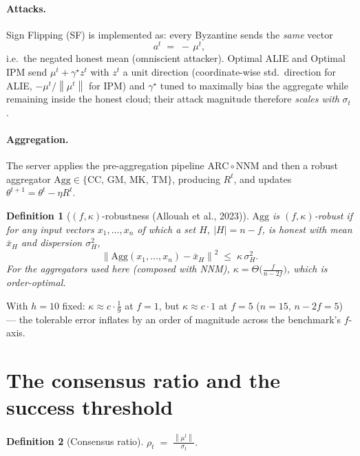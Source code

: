 \documentclass[11pt]{article}
\newtheorem{definition}{Definition}
\newcommand{\norm}[1]{\left\lVert #1 \right\rVert}
\newcommand{\agg}{\mathrm{Agg}}
\begin{document}
\paragraph{Attacks.} Sign Flipping (SF) is implemented as: every Byzantine
sends the \emph{same} vector
\begin{equation}
a^t \;=\; -\,\mu^t ,
\label{eq:sf}
\end{equation}
i.e.\ the negated honest mean (omniscient attacker). Optimal ALIE and Optimal
IPM send $\mu^t + \gamma^\star z^t$ with $z^t$ a unit direction (coordinate-wise
std.\ direction for ALIE, $-\mu^t/\norm{\mu^t}$ for IPM) and $\gamma^\star$
tuned to maximally bias the aggregate while remaining inside the honest cloud;
their attack magnitude therefore \emph{scales with} $\sigma_t$.

\paragraph{Aggregation.} The server applies the pre-aggregation pipeline
$\mathrm{ARC}\circ\mathrm{NNM}$ and then a robust aggregator
$\agg \in \{\text{CC, GM, MK, TM}\}$, producing $R^t$, and updates
$\theta^{t+1} = \theta^t - \eta R^t$.

\begin{definition}[$(f,\kappa)$-robustness \textnormal{(Allouah et al., 2023)}]
$\agg$ is $(f,\kappa)$-robust if for any input vectors $x_1,\dots,x_n$ of which
a set $H$, $|H| = n - f$, is honest with mean $\bar x_H$ and dispersion
$\sigma_H^2$,
\begin{equation}
\norm{\agg(x_1,\dots,x_n) - \bar x_H}^2 \;\le\; \kappa\, \sigma_H^2 .
\label{eq:kappa}
\end{equation}
For the aggregators used here (composed with NNM), $\kappa = \Theta\!\big(\tfrac{f}{n-2f}\big)$,
which is order-optimal.
\end{definition}

With $h = 10$ fixed: $\kappa \approx c\cdot\tfrac19$ at $f{=}1$, but
$\kappa \approx c\cdot 1$ at $f{=}5$ ($n{=}15$, $n-2f{=}5$) --- the tolerable
error inflates by an order of magnitude across the benchmark's $f$-axis.

\section{The consensus ratio and the success threshold}

\begin{definition}[Consensus ratio]
$\displaystyle \rho_t \;=\; \frac{\norm{\mu^t}}{\sigma_t}$.
\end{definition}
\end{document}
